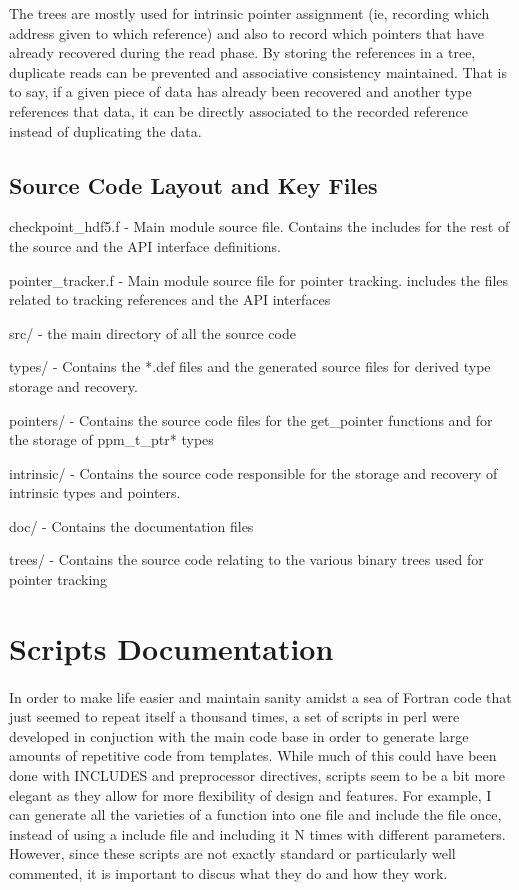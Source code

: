\documentclass{article}
\begin{document}
The trees are mostly used for intrinsic pointer assignment (ie, recording which address given to which reference) and also to record which pointers that have already recovered during the read phase. By storing the references in a tree, duplicate reads can be prevented and associative consistency maintained. That is to say, if a given piece of data has already been recovered and another type references that data, it can be directly associated to the recorded reference instead of duplicating the data.

\subsection{Source Code Layout and Key Files}
\begin{list}{}{}
\item checkpoint\_hdf5.f - Main module source file. Contains the includes for the rest of the source and the API interface definitions.
\item pointer\_tracker.f - Main module source file for pointer tracking. includes the files related to tracking references and the API interfaces
\item src/ - the main directory of all the source code
\item types/ - Contains the *.def files and the generated source files for derived type storage and recovery.
\item pointers/ - Contains the source code files for the get\_pointer functions and for the storage of ppm\_t\_ptr* types
\item intrinsic/ - Contains the source code responsible for the storage and recovery of intrinsic types and pointers.
\item doc/ - Contains the documentation files
\item trees/ - Contains the source code relating to the various binary trees used for pointer tracking
\end{list}
\section{Scripts Documentation}
\paragraph{}
In order to make life easier and maintain sanity amidst a sea of Fortran code that just seemed to repeat itself a thousand times, a set of scripts in perl were developed in conjuction with the main code base in order to generate large amounts of repetitive code from templates. While much of this could have been done with INCLUDES and preprocessor directives, scripts seem to be a bit more elegant as they allow for more flexibility of design and features. For example, I can generate all the varieties of a function into one file and include the file once, instead of using a include file and including it N times with different parameters. However, since these scripts are not exactly standard or particularly well commented, it is important to discus what they do and how they work.
\end{document}
